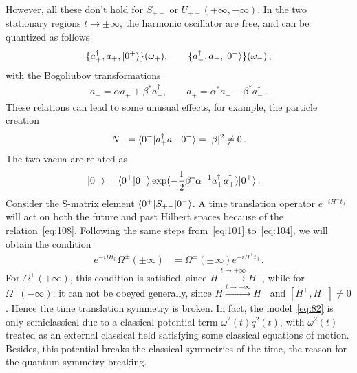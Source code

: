\documentclass[12pt,a4paper]{article}
\begin{document}
However, all these don't hold for $S_{+-}$ or
$U_{+-}(+\infty,-\infty)$. In the two stationary regions
$t\rightarrow\pm \infty$, the harmonic oscillator are free, and can
be quantized as follows
\begin{equation}
\label{eq:105}
\begin{split}
\{a_{+}^\dag,a_{+},\arrowvert0^+\rangle\}(\omega_+), \qquad
\{a_{-}^\dag,a_{-},\arrowvert0^-\rangle\}(\omega_-) \,,
\end{split}
\end{equation}
with the Bogoliubov transformations~\cite{j}
\begin{equation}
\label{eq:106}
\begin{split}
a_{-}=\alpha a_{+}+\beta^* a_{+}^{\dag},\qquad a_{+}=\alpha^*
a_{-}-\beta^* a_{-}^{\dag} \,.
\end{split}
\end{equation}
These relations can lead to some unusual effects, for example, the particle
creation
\begin{equation}
\label{eq:107}
\begin{split}
N_+ = \langle0^-\arrowvert a_{+}^\dag
a_{+}\arrowvert0^-\rangle=|\beta|^2\neq 0 \,.
\end{split}
\end{equation}
The two vacua are related as~\cite{j}
\begin{equation}
\label{eq:108}
\begin{split}
\arrowvert0^-\rangle &=
\langle0^+\arrowvert0^-\rangle\exp(-\frac{1}{2}\beta^*\alpha^{-1}a_{+}^\dag
a_{+}^\dag)\arrowvert0^+\rangle \,.
\end{split}
\end{equation}
Consider the S-matrix element $\langle0^+\arrowvert
S_{+-}\arrowvert0^-\rangle$. A time translation operator
$e^{-iH^+t_0}$ will act on both the future and past Hilbert
spaces because of the relation~\eqref{eq:108}. Following the same
steps from~\eqref{eq:101} to~\eqref{eq:104}, we will obtain the
condition
\begin{equation}
\label{eq:109}
\begin{split}
e^{-iH t_0}\Omega^{\pm}(\pm\infty) &=
\Omega^{\pm}(\pm\infty)e^{-iH^+ t_0} \,.
\end{split}
\end{equation}
For $\Omega^+(+\infty)$, this condition is satisfied, since
$H\stackrel{t\rightarrow+\infty}{\longrightarrow}H^+$, while for
$\Omega^-(-\infty)$, it can not be obeyed generally,
since $H\stackrel{t\rightarrow-\infty}{\longrightarrow}H^-$ and
$[H^+,H^-]\neq0$. Hence the time translation symmetry is broken. In fact, the model~\eqref{eq:82} is only semiclassical due to a classical potential term
$\omega^2(t)q^2(t)$, with $\omega^2(t)$ treated as an
external classical field satisfying some classical equations of
motion. Besides, this potential breaks the classical symmetries of the time, the reason for the quantum symmetry breaking.
\end{document}
